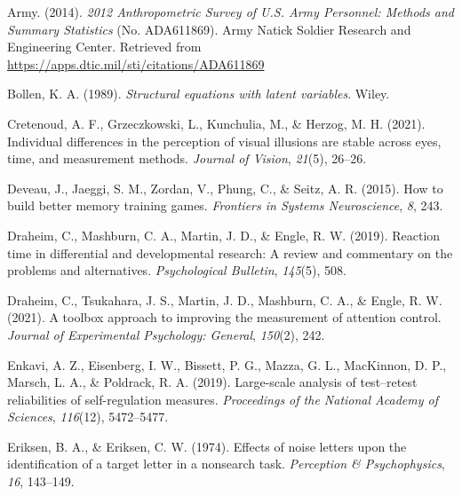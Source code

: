 \documentclass[
  ,man]{apa6}
\newlength{\cslhangindent}
\newlength{\cslentryspacingunit} %
\newenvironment{CSLReferences}[2] %
 {%
  \setlength{\parindent}{0pt}
  \ifodd #1
  \let\oldpar\par
  \def\par{\hangindent=\cslhangindent\oldpar}
  \fi
  \setlength{\parskip}{#2\cslentryspacingunit}
 }%
 {}
\begin{document}
\hypertarget{refs}{}
\begin{CSLReferences}{1}{0}
\leavevmode{}%
Army. (2014). \emph{2012 {Anthropometric Survey} of {U}.{S}. {Army Personnel}: {Methods} and {Summary Statistics}} (No. ADA611869). {Army Natick Soldier Research and Engineering Center}. Retrieved from \url{https://apps.dtic.mil/sti/citations/ADA611869}

\leavevmode{}%
Bollen, K. A. (1989). \emph{Structural equations with latent variables}. {Wiley}.

\leavevmode{}%
Cretenoud, A. F., Grzeczkowski, L., Kunchulia, M., \& Herzog, M. H. (2021). Individual differences in the perception of visual illusions are stable across eyes, time, and measurement methods. \emph{Journal of Vision}, \emph{21}(5), 26--26.

\leavevmode{}%
Deveau, J., Jaeggi, S. M., Zordan, V., Phung, C., \& Seitz, A. R. (2015). How to build better memory training games. \emph{Frontiers in Systems Neuroscience}, \emph{8}, 243.

\leavevmode{}%
Draheim, C., Mashburn, C. A., Martin, J. D., \& Engle, R. W. (2019). Reaction time in differential and developmental research: {A} review and commentary on the problems and alternatives. \emph{Psychological Bulletin}, \emph{145}(5), 508.

\leavevmode{}%
Draheim, C., Tsukahara, J. S., Martin, J. D., Mashburn, C. A., \& Engle, R. W. (2021). A toolbox approach to improving the measurement of attention control. \emph{Journal of Experimental Psychology: General}, \emph{150}(2), 242.

\leavevmode{}%
Enkavi, A. Z., Eisenberg, I. W., Bissett, P. G., Mazza, G. L., MacKinnon, D. P., Marsch, L. A., \& Poldrack, R. A. (2019). Large-scale analysis of test--retest reliabilities of self-regulation measures. \emph{Proceedings of the National Academy of Sciences}, \emph{116}(12), 5472--5477.

\leavevmode{}%
Eriksen, B. A., \& Eriksen, C. W. (1974). Effects of noise letters upon the identification of a target letter in a nonsearch task. \emph{Perception \& Psychophysics}, \emph{16}, 143--149.


\end{CSLReferences}
\end{document}
